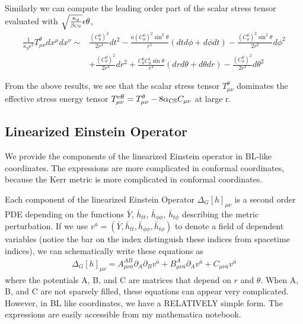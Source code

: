 \documentclass[aps,prd,amsmath,showpacs,amssymb,superscriptaddress,nofootinbib,longbibliography,eqsecnum,preprintnumbers]{revtex4-1}
\newcommand{\acs}{\alpha_{\rm CS}}
\newcommand{\bcs}{\beta_{\rm CS}}
\begin{document}
Similarly we can compute the leading order part of the scalar stress tensor evaluated with $\sqrt{\frac{\kappa_g }{\bcs}}\epsilon\theta$,
\begin{align}
\frac{1}{\kappa_g \epsilon^2}T^\theta_{\mu\nu}dx^\mu dx^\nu\sim &\frac{(C_\theta^0)^2}{2r^4}dt^2
-\frac{a(C_\theta^0)^2\sin^2\theta }{r^5}(dt d\phi +d\phi dt) -\frac{(C_\theta^0)^2\sin^2\theta}{2r^2}d\phi^2 \nonumber \\
&+\frac{(C_\theta^0)^2}{2r^4}dr^2
+\frac{C_\theta^0 C_\theta^1 \sin\theta}{r^4}(dr d\theta +d\theta dr) -\frac{(C_\theta^0)^2}{2r^2}d\theta^2 \label{eq:Tlarge}
\end{align}

From the above results, we see that the scalar stress tensor $T^\theta_{\mu\nu}$ dominates the effective stress energy tensor $T_{\mu \nu}^{\rm eff} =T_{\mu \nu}^\theta -8\acs C_{\mu\nu}$ at large r.


\subsection{Linearized Einstein Operator}

We provide the components of the linearized Einstein operator in BL-like coordinates. The expressions are more complicated in conformal coordinates, because the Kerr metric is more complicated in conformal coordinates.

Each component of the linearized Einstein Operator $\Delta_G[h]_{\mu\nu}$ is a second order PDE depending on the functions $\bar Y$, $\bar h_{tt}$, $\bar h_{\phi\phi}$, $\bar h_{t\phi}$ describing the metric perturbation. If we use $v^{\bar a}=(\bar Y, \bar h_{tt}, \bar h_{\phi\phi}, \bar h_{t\phi})$ to denote a field of dependent variables (notice the bar on the index distinguish these indices from spacetime indices), we can schematically write these equations as 
\begin{align}
\Delta_G[h]_{\mu\nu}= A_{\mu \nu \bar a}^{AB}\partial_A\partial_B v^{\bar a} + B_{\mu \nu \bar a}^{A}\partial_A v^{\bar a}+C_{\mu \nu \bar a}v^{\bar a} \label{eq:fieldBL}
\end{align}
where the potentials A, B, and C are matrices that depend on $r$ and $\theta$. When A, B, and C are not sparsely filled, these equations can appear very complicated. However, in BL like coordinates, we have a RELATIVELY simple form. The expressions are easily accessible from my mathematica notebook. 
\end{document}
